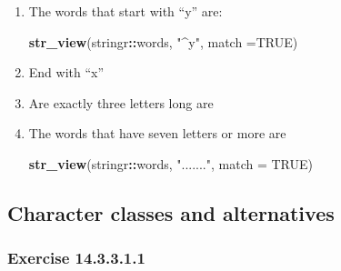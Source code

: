 \documentclass[]{book}
\newenvironment{Shaded}{\begin{snugshade}}{\end{snugshade}}
\newcommand{\DataTypeTok}[1]{\textcolor[rgb]{0.13,0.29,0.53}{#1}}
\newcommand{\KeywordTok}[1]{\textcolor[rgb]{0.13,0.29,0.53}{\textbf{#1}}}
\newcommand{\NormalTok}[1]{#1}
\newcommand{\OperatorTok}[1]{\textcolor[rgb]{0.81,0.36,0.00}{\textbf{#1}}}
\newcommand{\OtherTok}[1]{\textcolor[rgb]{0.56,0.35,0.01}{#1}}
\newcommand{\StringTok}[1]{\textcolor[rgb]{0.31,0.60,0.02}{#1}}
\theoremstyle{plain}
\theoremstyle{remark}
\begin{document}
\begin{enumerate}
\def\labelenumi{\arabic{enumi}.}
\item
  The words that start with ``y'' are:

\begin{Shaded}
\begin{Highlighting}[]
\KeywordTok{str_view}\NormalTok{(stringr}\OperatorTok{::}\NormalTok{words, }\StringTok{"^y"}\NormalTok{, }\DataTypeTok{match =}\OtherTok{TRUE}\NormalTok{)}
\end{Highlighting}
\end{Shaded}
\item
  End with ``x''

\begin{Shaded}
\end{Shaded}
\item
  Are exactly three letters long are

\begin{Shaded}
\end{Shaded}
\item
  The words that have seven letters or more are

\begin{Shaded}
\begin{Highlighting}[]
\KeywordTok{str_view}\NormalTok{(stringr}\OperatorTok{::}\NormalTok{words, }\StringTok{"......."}\NormalTok{, }\DataTypeTok{match =} \OtherTok{TRUE}\NormalTok{)}
\end{Highlighting}
\end{Shaded}
\end{enumerate}

\hypertarget{character-classes-and-alternatives}{%
\subsection{Character classes and
alternatives}\label{character-classes-and-alternatives}}

\hypertarget{exercise-14.3.3.1.1}{%
\subsubsection*{\texorpdfstring{Exercise
{14.3.3.1.1}}{Exercise 14.3.3.1.1}}\label{exercise-14.3.3.1.1}}
\end{document}
